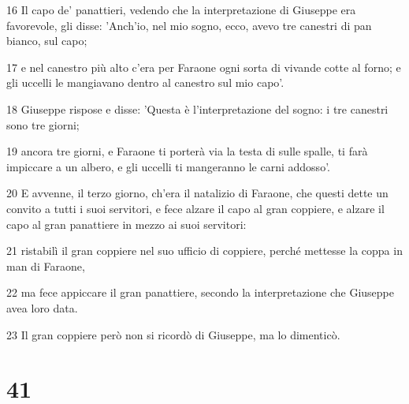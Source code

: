 \par 16 Il capo de' panattieri, vedendo che la interpretazione di Giuseppe era favorevole, gli disse: 'Anch'io, nel mio sogno, ecco, avevo tre canestri di pan bianco, sul capo;
\par 17 e nel canestro più alto c'era per Faraone ogni sorta di vivande cotte al forno; e gli uccelli le mangiavano dentro al canestro sul mio capo'.
\par 18 Giuseppe rispose e disse: 'Questa è l'interpretazione del sogno: i tre canestri sono tre giorni;
\par 19 ancora tre giorni, e Faraone ti porterà via la testa di sulle spalle, ti farà impiccare a un albero, e gli uccelli ti mangeranno le carni addosso'.
\par 20 E avvenne, il terzo giorno, ch'era il natalizio di Faraone, che questi dette un convito a tutti i suoi servitori, e fece alzare il capo al gran coppiere, e alzare il capo al gran panattiere in mezzo ai suoi servitori:
\par 21 ristabilì il gran coppiere nel suo ufficio di coppiere, perché mettesse la coppa in man di Faraone,
\par 22 ma fece appiccare il gran panattiere, secondo la interpretazione che Giuseppe avea loro data.
\par 23 Il gran coppiere però non si ricordò di Giuseppe, ma lo dimenticò.

\chapter{41}


